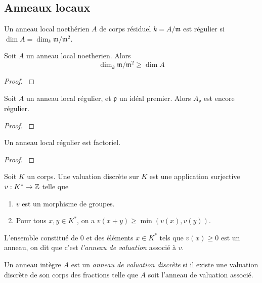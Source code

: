 \subsection{Anneaux locaux}

\begin{defn}
Un anneau local noethérien $A$ de corps résiduel $k=A/\mathfrak{m}$ est régulier si $\dim A =\dim_k\mathfrak{m}/\mathfrak{m}^2$.
\end{defn}

\begin{prop}
Soit $A$ un anneau local noetherien. Alors $$\dim_k\mathfrak{m}/\mathfrak{m}^2\geq \dim A $$
\end{prop}
\begin{proof}
\cite[5.14]{Matsumura} 
\end{proof}

\begin{thm}
Soit $A$ un anneau local régulier, et $\mathfrak{p}$ un idéal premier. Alors $A_\mathfrak{p}$ est encore régulier.
\end{thm}
\begin{proof}
\cite[19.3]{Matsumura}
\end{proof}

\begin{thm}\label{reglocufd}
Un anneau local régulier est factoriel.
\end{thm}
\begin{proof}
\cite[20.3]{Matsumura}
\end{proof}

\begin{defn}
Soit $K$ un corps. Une valuation discrète sur $K$ est une application surjective $v:K^*\rightarrow \mathbb{Z}$ telle que
\begin{enumerate}
\item $v$ est un morphisme de groupes.
\item Pour tous $x,y\in K^*$, on a $v(x+y)\geq \min(v(x),v(y))$.
\end{enumerate}
L'ensemble constitué de $0$ et des éléments $x\in K^*$ tels que $v(x)\geq 0$ est un anneau, on dit que c'est \textit{l'anneau de valuation} associé à $v$.
\end{defn}

\begin{defn}
Un anneau intègre $A$ est un \textit{anneau de valuation discrète} si il existe une valuation discrète de son corps des fractions telle que $A$ soit l'anneau de valuation associé.
\end{defn}

